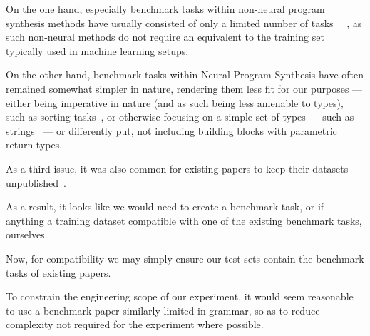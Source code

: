 \documentclass{article}
\begin{document}
On the one hand, especially benchmark tasks within non-neural program synthesis methods have usually consisted of only a limited number of tasks%
~\citep{myth,lambda2,typedmil,houdini,tamandu,dilp}~\cite{terpret},
as such non-neural methods do not require an equivalent to the training set typically used in machine learning setups.

On the other hand, benchmark tasks within Neural Program Synthesis have often remained somewhat simpler in nature,
rendering them less fit for our purposes --- either being imperative in nature (and as such being less amenable to types),
such as sorting tasks~\citep{npi,alphanpi},
or otherwise focusing on a simple set of types --- such as strings~\citep{nsps} ---%
or differently put, not including building blocks with parametric return types.

As a third issue, it was also common for existing papers to keep their datasets unpublished~\citep{nsps,deepcoder}.

As a result, it looks like we would need to create a benchmark task, or if anything a training dataset compatible with one of the existing benchmark tasks, ourselves.

Now, for compatibility we may simply ensure our test sets contain the benchmark tasks of existing papers.

To constrain the engineering scope of our experiment, it would seem reasonable to use a benchmark paper similarly limited in grammar, so as to reduce complexity not required for the experiment where possible.


\end{document}
